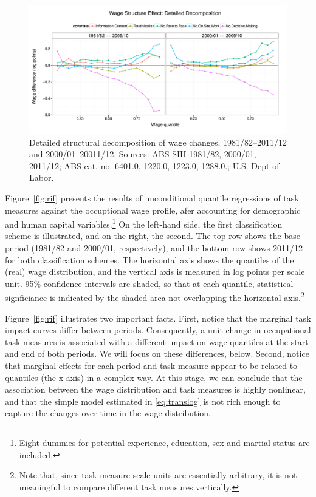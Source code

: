 \begin{figure}
  \centering
  \includegraphics[width=\textwidth]{../figure/structure_decomp.pdf}
  \caption{Detailed structural decomposition of wage changes, 1981/82--2011/12 and 2000/01--20011/12. Sources: ABS SIH 1981/82, 2000/01, 2011/12; ABS cat. no. 6401.0, 1220.0, 1223.0, 1288.0.; U.S. Dept of Labor.}
  \label{fig:structure}
\end{figure}


Figure~\ref{fig:rif} presents the results of unconditional quantile regressions of task measures against the occuptional wage profile, afer accounting for demographic and human capital variables.\footnote{Eight dummies for potential experience, education, sex and martial status are included.} On the left-hand side, the first classification scheme is illustrated, and on the right, the second. The top row shows the base period (1981/82 and 2000/01, respectively), and the bottom row shows 2011/12 for both classification schemes. The horizontal axis shows the quantiles of the (real) wage distribution, and the vertical axis is measured in log points per scale unit. 95\% confidence intervals are shaded, so that at each quantile, statistical signficiance is indicated by the shaded area not overlapping the horizontal axis.\footnote{Note that, since task measure scale units are essentially arbitrary, it is not meaningful to compare different task measures vertically.}

Figure~\ref{fig:rif} illustrates two important facts. First, notice that the marginal task impact curves differ between periods. Consequently, a unit change in occupational task measures is associated with a different impact on wage quantiles at the start and end of both periods. We will focus on these differences, below. Second, notice that marginal effects for each period and task measure appear to be related to quantiles (the x-axis) in a complex way. At this stage, we can conclude that the association between the wage distribution and task measures is highly nonlinear, and that the simple model estimated in \eqref{eq:translog} is not rich enough to capture the changes over time in the wage distribution.


